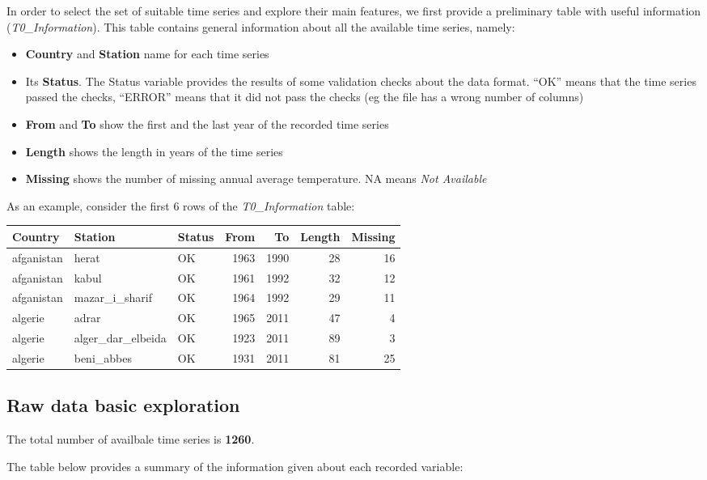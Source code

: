 \documentclass[]{article}
\begin{document}
In order to select the set of suitable time series and explore their
main features, we first provide a preliminary table with useful
information (\emph{T0\_Information}). This table contains general
information about all the available time series, namely:

\begin{itemize}
\item
  \textbf{Country} and \textbf{Station} name for each time series
\item
  Its \textbf{Status}. The Status variable provides the results of some
  validation checks about the data format. ``OK'' means that the time
  series passed the checks, ``ERROR'' means that it did not pass the
  checks (eg the file has a wrong number of columns)
\item
  \textbf{From} and \textbf{To} show the first and the last year of the
  recorded time series
\item
  \textbf{Length} shows the length in years of the time series
\item
  \textbf{Missing} shows the number of missing annual average
  temperature. NA means \emph{Not Available}
\end{itemize}

As an example, consider the first 6 rows of the \emph{T0\_Information}
table:

\begin{longtable}[]{@{}lllrrrr@{}}
\toprule
Country & Station & Status & From & To & Length & Missing\tabularnewline
\midrule
\endhead
afganistan & herat & OK & 1963 & 1990 & 28 & 16\tabularnewline
afganistan & kabul & OK & 1961 & 1992 & 32 & 12\tabularnewline
afganistan & mazar\_i\_sharif & OK & 1964 & 1992 & 29 &
11\tabularnewline
algerie & adrar & OK & 1965 & 2011 & 47 & 4\tabularnewline
algerie & alger\_dar\_elbeida & OK & 1923 & 2011 & 89 & 3\tabularnewline
algerie & beni\_abbes & OK & 1931 & 2011 & 81 & 25\tabularnewline
\bottomrule
\end{longtable}

\hypertarget{raw-data-basic-exploration}{%
\subsection{Raw data basic
exploration}\label{raw-data-basic-exploration}}

The total number of availbale time series is \textbf{1260}.

The table below provides a summary of the information given about each
recorded variable:
\end{document}
